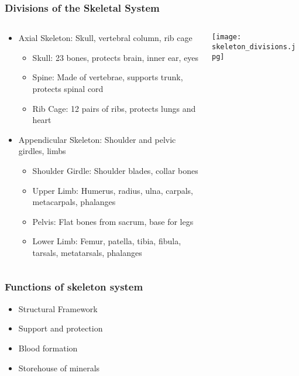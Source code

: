 \begin{frame}[fragile]\frametitle{Divisions of the Skeletal System}
\begin{columns}
    \begin{column}[T]{0.5\linewidth}
      \begin{itemize}
		\item Axial Skeleton: Skull, vertebral column, rib cage
			\begin{itemize}
			\item Skull: 23 bones, protects brain, inner ear, eyes
			\item Spine: Made of vertebrae, supports trunk, protects spinal cord
			\item Rib Cage: 12 pairs of ribs, protects lungs and heart
			\end{itemize}

		\item Appendicular Skeleton: Shoulder and pelvic girdles, limbs
			\begin{itemize}
			\item Shoulder Girdle: Shoulder blades, collar bones
			\item Upper Limb: Humerus, radius, ulna, carpals, metacarpals, phalanges
			\item Pelvis: Flat bones from sacrum, base for legs
			\item Lower Limb: Femur, patella, tibia, fibula, tarsals, metatarsals, phalanges
		    \end{itemize}
	  \end{itemize}
    \end{column}
    \begin{column}[T]{0.5\linewidth}
		\begin{center}
		\texttt{[image: skeleton\_divisions.jpg]} 
		\end{center}	
    \end{column}
  \end{columns}
\end{frame}

\begin{frame}[fragile]\frametitle{Functions of skeleton system}

\begin{itemize}
\item Structural Framework
\item Support and protection
\item Blood formation
\item Storehouse of minerals
\end{itemize}
	  
\end{frame}


